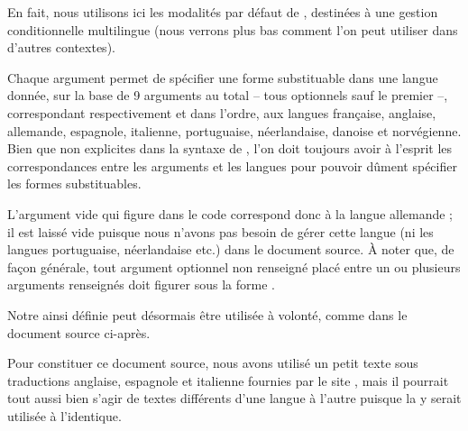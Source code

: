 \documentclass{article}
\begin{document}
En fait, nous utilisons ici les modalités par défaut de , destinées à une gestion conditionnelle multilingue (nous verrons plus bas comment l'on peut utiliser  dans d'autres contextes).

Chaque argument permet de spécifier une forme substituable dans une langue donnée, sur la base de 9 arguments au total -- tous optionnels sauf le premier --, correspondant respectivement et dans l'ordre, aux langues française, anglaise, allemande, espagnole, italienne, portuguaise, néerlandaise, danoise et norvégienne. Bien que non explicites dans la syntaxe de , l'on doit toujours avoir à l'esprit les correspondances entre les arguments et les langues pour pouvoir dûment spécifier les formes substituables.

L'argument vide qui figure dans le code correspond donc à la langue allemande ; il est laissé vide puisque nous n'avons pas besoin de gérer cette langue (ni les langues portuguaise, néerlandaise etc.) dans le document source. À noter que, de façon générale, tout argument optionnel non renseigné placé entre un ou plusieurs arguments renseignés doit figurer sous la forme \argovoid{}.

\tutostep
Notre  ainsi définie peut désormais être utilisée à volonté, comme dans le document source ci-après.

Pour constituer ce document source, nous avons utilisé un petit texte sous traductions anglaise, espagnole et italienne fournies par le site , mais il pourrait tout aussi bien s'agir de textes différents d'une langue à l'autre puisque la  y serait utilisée à l'identique.
\end{document}
